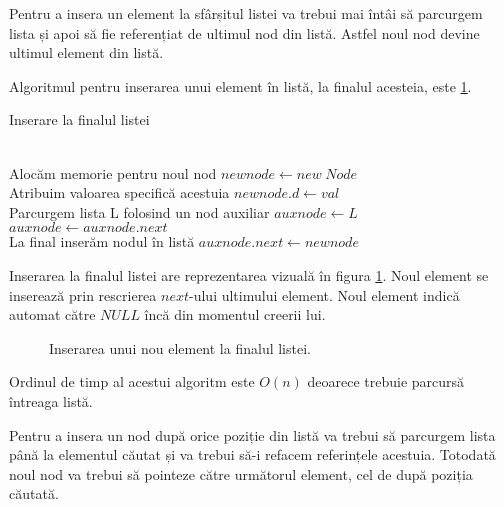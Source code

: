 Pentru a insera un element la sfârșitul listei va trebui mai întâi să parcurgem lista și apoi să fie referențiat de ultimul nod din listă. Astfel noul nod devine ultimul element din listă.

Algoritmul pentru inserarea unui element în listă, la finalul acesteia, este  \ref{fig:insertend}.

\begin{algorithm}[H]
	\caption{Inserare la finalul listei}\label{alg:insertend}
	\begin{algorithmic}[1]
		 \\		
		\Comment Alocăm memorie pentru noul nod \hfill \tab{}\tab{}\tab{}
		\State $newnode \gets new \hspace{3pt} Node$\\
		\Comment Atribuim valoarea specifică acestuia \hfill \tab{}\tab{}\tab{}
		\State $newnode.d \gets val$\\
		\Comment Parcurgem lista L folosind un nod auxiliar  \hfill \tab{}\tab{}
		\State $auxnode \gets L$
		\While {$auxnode.next \neq  NULL$}
		\State $auxnode \gets auxnode.next$
		\EndWhile 	\\
		\Comment La final inserăm nodul în listă  \hfill \tab{}\tab{}\tab{}	
		\State $auxnode.next \gets newnode$
		\EndProcedure
	\end{algorithmic}
\end{algorithm}

Inserarea la finalul listei are reprezentarea vizuală în figura \ref{fig:insertend}. Noul element se inserează prin rescrierea $next$-ului ultimului element. Noul element indică automat către $NULL$ încă din momentul creerii lui.


\begin{figure}[H] 
	\centering	
	{
	}
	\caption{Inserarea unui nou element la finalul listei.} 
	\label{fig:insertend}
\end{figure}

Ordinul de timp al acestui algoritm este $O(n)$ deoarece trebuie parcursă întreaga listă.

Pentru a insera un nod după orice poziție din listă va trebui să parcurgem lista până la elementul căutat și va trebui să-i refacem referințele acestuia. Totodată noul nod va trebui să pointeze către următorul element, cel de după poziția căutată.


